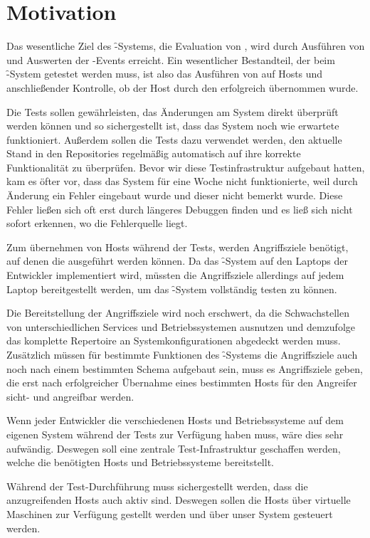 \section{Motivation}
\label{sec:test_goals}
\authors{\HM, \LM}{\MW \and \JF}
Das wesentliche Ziel des \f-Systems, die
Evaluation von , wird durch Ausführen von 
und Auswerten der -Events erreicht. Ein wesentlicher
Bestandteil, der beim \f-System getestet werden muss, ist also das
Ausführen von  auf Hosts und anschließender Kontrolle,
ob der Host durch den  erfolgreich übernommen
wurde. 

Die Tests sollen gewährleisten, das Änderungen am System direkt überprüft
werden können und so sichergestellt ist, dass das System noch wie erwartete funktioniert.
Außerdem sollen die Tests dazu verwendet werden, den aktuelle Stand
in den Repositories regelmäßig automatisch auf ihre korrekte Funktionalität zu
überprüfen.
Bevor wir diese Testinfrastruktur aufgebaut hatten, kam es öfter vor,
dass das System für eine Woche nicht funktionierte, weil durch Änderung
ein Fehler eingebaut wurde und dieser nicht bemerkt wurde.
Diese Fehler ließen sich oft erst durch längeres Debuggen finden und es
ließ sich nicht sofort erkennen, wo die Fehlerquelle liegt.

Zum übernehmen von Hosts während der Tests, werden Angriffsziele benötigt,
auf denen die  ausgeführt werden können. Da das \f-System
auf den Laptops der Entwickler implementiert wird, müssten die Angriffsziele
allerdings auf jedem Laptop bereitgestellt werden, um das \f-System
vollständig testen zu können.

Die Bereitstellung der Angriffsziele wird noch erschwert, da die
 Schwachstellen von unterschiedlichen Services und
Betriebssystemen ausnutzen und demzufolge das komplette Repertoire an
Systemkonfigurationen abgedeckt werden muss. Zusätzlich müssen für
bestimmte Funktionen des \f-Systems die Angriffsziele auch noch nach
einem bestimmten Schema aufgebaut sein, \zB muss es Angriffsziele
geben, die erst nach erfolgreicher Übernahme eines bestimmten Hosts
für den Angreifer sicht- und angreifbar werden.

Wenn jeder Entwickler die verschiedenen Hosts und Betriebssysteme auf dem
eigenen System während der Tests zur Verfügung haben muss, wäre dies sehr
aufwändig. Deswegen soll eine zentrale Test-Infrastruktur geschaffen
werden, welche die benötigten Hosts und Betriebssysteme bereitstellt.

Während der Test-Durchführung muss sichergestellt werden, dass die
anzugreifenden Hosts auch aktiv sind. Deswegen sollen die Hosts über
virtuelle Maschinen zur Verfügung gestellt werden und über unser System
gesteuert werden.
